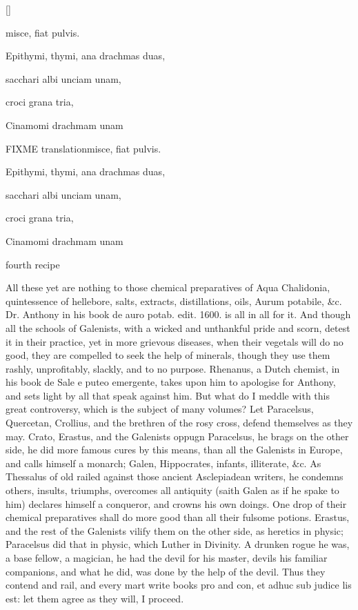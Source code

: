 \begin{Prescription}[H]
[\baselineskip]
\begin{prescriptionbox}{}{\textlatin{misce, fiat pulvis.}}
\item \textlatin{Epithymi, thymi, ana drachmas duas},
\item \textlatin{sacchari albi unciam unam},
\item \textlatin{croci grana tria},
\item \textlatin{Cinamomi drachmam unam}
\end{prescriptionbox}
\begin{prescriptionbox}{FIXME translation}{\textlatin{misce, fiat pulvis.}}
\item \textlatin{Epithymi, thymi, ana drachmas duas},
\item \textlatin{sacchari albi unciam unam},
\item \textlatin{croci grana tria},
\item \textlatin{Cinamomi drachmam unam}
\end{prescriptionbox}
\caption{fourth recipe}
\end{Prescription}

All these yet are nothing to those chemical preparatives of Aqua
Chalidonia, quintessence of hellebore, salts, extracts, distillations,
oils, Aurum potabile, \&c. Dr. Anthony in his book de auro potab. edit.
1600. is all in all for it. And though all the schools of
Galenists, with a wicked and unthankful pride and scorn, detest it in
their practice, yet in more grievous diseases, when their vegetals will
do no good, they are compelled to seek the help of minerals, though
they use them rashly, unprofitably, slackly, and to no purpose.
Rhenanus, a Dutch chemist, in his book de Sale e puteo emergente, takes
upon him to apologise for Anthony, and sets light by all that speak
against him. But what do I meddle with this great controversy, which is
the subject of many volumes? Let Paracelsus, Quercetan, Crollius, and
the brethren of the rosy cross, defend themselves as they may. Crato,
Erastus, and the Galenists oppugn Paracelsus, he brags on the other
side, he did more famous cures by this means, than all the Galenists in
Europe, and calls himself a monarch; Galen, Hippocrates, infants,
illiterate, \&c. As Thessalus of old railed against those ancient
Asclepiadean writers, he condemns others, insults, triumphs,
overcomes all antiquity (saith Galen as if he spake to him) declares
himself a conqueror, and crowns his own doings. One drop of their
chemical preparatives shall do more good than all their fulsome
potions. Erastus, and the rest of the Galenists vilify them on the
other side, as heretics in physic; Paracelsus did that in physic,
which Luther in Divinity. A drunken rogue he was, a base fellow,
a magician, he had the devil for his master, devils his familiar
companions, and what he did, was done by the help of the devil. Thus
they contend and rail, and every mart write books pro and con, et adhuc
sub judice lis est: let them agree as they will, I proceed.


